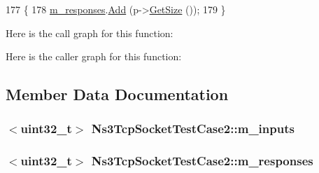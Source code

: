 \begin{DoxyCode}
177 \{
178   \hyperlink{classNs3TcpSocketTestCase2_a417144b7d1e3b0270ada62132567de2e}{m\_responses}.\hyperlink{classns3_1_1TestVectors_a59ceaabfb75eb96a93f607405868bfc0}{Add} (p->\hyperlink{classns3_1_1Packet_a462855c9929954d4301a4edfe55f4f1c}{GetSize} ());
179 \}
\end{DoxyCode}


Here is the call graph for this function\+:




Here is the caller graph for this function\+:




\subsection{Member Data Documentation}
\subsubsection[{\texorpdfstring{m\+\_\+inputs}{m_inputs}}]{$<$uint32\+\_\+t$>$ Ns3\+Tcp\+Socket\+Test\+Case2\+::m\+\_\+inputs\hspace{0.3cm}{\ttfamily [private]}}\hypertarget{classNs3TcpSocketTestCase2_a4415da1b4f4e17ba36065c6ed526f46c}{}\label{classNs3TcpSocketTestCase2_a4415da1b4f4e17ba36065c6ed526f46c}
\subsubsection[{\texorpdfstring{m\+\_\+responses}{m_responses}}]{$<$uint32\+\_\+t$>$ Ns3\+Tcp\+Socket\+Test\+Case2\+::m\+\_\+responses\hspace{0.3cm}{\ttfamily [private]}}\hypertarget{classNs3TcpSocketTestCase2_a417144b7d1e3b0270ada62132567de2e}{}\label{classNs3TcpSocketTestCase2_a417144b7d1e3b0270ada62132567de2e}
